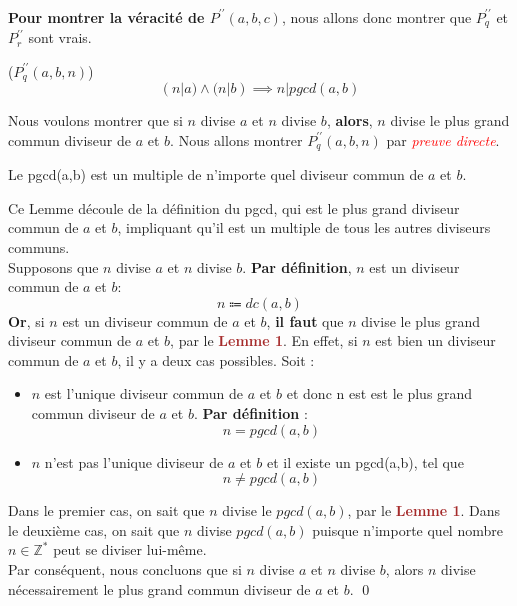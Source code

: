 \documentclass[16pt]{report}
\begin{document}
\begin{multicols*}{2}
    \paragraph{}
    \textbf{Pour montrer la véracité de $P^{\prime\prime}(a,b,c)$}, 
    nous allons donc montrer que $P^{\prime\prime}_q$ et $P^{\prime\prime}_r$ sont vrais.


    \begin{prop}{($P^{\prime\prime}_q(a,b, n)$)}{}
        \[ (n|a) \land (n|b) \implies  n|pgcd(a,b) \]
    \end{prop}

    \begin{Preuve*}{}{}
       Nous voulons montrer que si $n$ divise $a$ et $n$ divise $b$, \textbf{alors}, $n$ 
       divise le plus grand commun diviseur de $a$ et $b$. Nous allons montrer 
        $P^{\prime\prime}_q(a,b, n)$ par \textcolor{red}{\textit{preuve directe}}. 
        \begin{Lemme}{}{}
            Le pgcd(a,b) est un multiple de n'importe quel diviseur commun de $a$ et $b$.
        \end{Lemme}
        Ce Lemme découle de la définition du pgcd, qui est le plus grand diviseur commun de \( a \) et \( b \),
        impliquant qu'il est un multiple de tous les autres diviseurs communs. \vspace{1em}\\

        Supposons que $n$ divise $a$ et $n$ divise $b$. \textbf{Par définition}, $n$ est un diviseur 
        commun de $a$ et $b$:  
        \[ n \Coloneqq dc(a,b) \]
        \textbf{Or}, si $n$ est un diviseur commun de $a$ et $b$, \textbf{il faut} que $n$ divise le 
        plus grand diviseur commun de $a$ et $b$, par le \textbf{\textcolor{brown}{Lemme 1}}.
        En effet, si $n$ est bien un diviseur commun de $a$ et $b$, il y a deux cas possibles. Soit :
        \begin{itemize}
            \item $n$ est l'unique diviseur commun de $a$ et $b$ et donc n est est le plus grand commun diviseur 
                de $a$ et $b$. \textbf{Par définition} : 
                \[ n = pgcd(a,b) \]
            \item $n$ n'est pas l'unique diviseur de $a$ et $b$ et il existe un pgcd(a,b), tel que 
                \[ n \neq pgcd(a,b) \]
        \end{itemize}
        Dans le premier cas, on sait que $n$ divise le $pgcd(a,b)$, par le \textcolor{brown}{\textbf{Lemme 1}}. 
        Dans le deuxième cas, on sait que $n$ divise $pgcd(a,b)$ puisque n'importe quel 
        nombre $n \in \mathbb{Z^*}$ peut se diviser lui-même. \vspace{1em} \\      
        Par conséquent, nous concluons que si $n$ divise $a$ et $n$ divise $b$, alors $n$ divise 
        nécessairement le plus grand commun diviseur de $a$ et $b$. \qed
    \end{Preuve*}
        


\end{multicols*}
\end{document}
